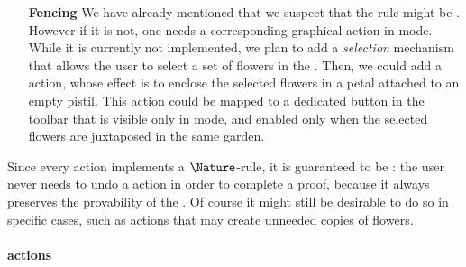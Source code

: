 \begin{itemize}
  \item[\textbf{Fencing}] We have already mentioned that we suspect that the
   rule might be . However if it is not, one needs a
  corresponding graphical action in \Proof mode. While it is currently not
  implemented, we plan to add a \emph{selection} mechanism that allows the user
  to select a set of flowers in the . Then, we could add a 
  action, whose effect is to enclose the selected flowers in a petal attached to
  an empty pistil. This action could be mapped to a dedicated button in the
  toolbar that is visible only in \Proof mode, and enabled only when the
  selected flowers are juxtaposed in the same garden.
\end{itemize}

Since every \Proof action implements a $\Nature$-rule, it is guaranteed to be
\emph{}: the user never needs to undo a \Proof action in order to
complete a proof, because it always preserves the provability of the . Of
course it might still be desirable to do so in specific cases, such as
 actions that may create unneeded copies of flowers.

\paragraph{\Edit actions}

